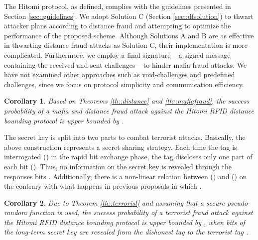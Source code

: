 \documentclass{article}
\newtheorem{corollary}{Corollary}
\begin{document}
The Hitomi protocol, as defined,  complies with the guidelines presented in Section \ref{sec::guidelines}. We adopt Solution C (Section \ref{sec::dfsolution}) to thwart attacker plans according to distance fraud and attempting to optimize the performance of the proposed scheme. Although Solutions A and B are as effective in thwarting distance fraud attacks as Solution C,  their implementation is more complicated. Furthermore, we employ a final signature -- a signed message  containing the received and sent challenges -- to hinder mafia fraud attacks. We have not examined other approaches such as void-challenges and predefined challenges, since we focus on protocol simplicity and communication efficiency.

\begin{corollary}
 Based on Theorems \ref{th::distance} and \ref{th::mafiafraud}, the success probability of a mafia and distance fraud attack against the Hitomi RFID distance bounding protocol is upper bounded by  .
\end{corollary}

The secret key  is split into two parts  to combat terrorist attacks.  Basically, the above construction represents a secret sharing strategy. Each time the tag is interrogated () in the rapid bit exchange phase, the tag discloses only one part of each bit (). Thus, no information on the secret key  is revealed through the responses bits .  Additionally, there is a non-linear relation between () and () on the contrary with what happens in previous proposals \cite{KimAKSP-2008-icisc,TuP-2007-rfidtechnology,reid2007} in which  .

\begin{corollary}
Due to Theorem \ref{th::terrorist} and assuming that a secure pseudo-random function  is used, the success probability of a terrorist fraud attack against the Hitomi RFID distance bounding protocol is upper bounded by , when  bits of the long-term secret key are revealed from the dishonest tag  to the terrorist tag  .
\end{corollary}
\end{document}
